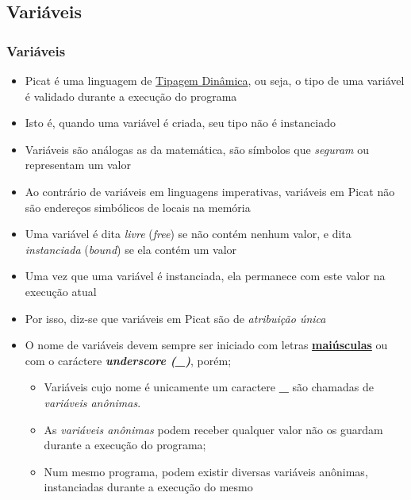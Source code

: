 
\subsection{Variáveis}

\begin{frame}[allowframebreaks=0.90]
	\frametitle{Variáveis}
	
	\begin{itemize}
		
		\item Picat é uma linguagem de \underline{Tipagem Dinâmica}, ou seja, o tipo de uma variável 
		é validado durante a execução do programa
		
		
		\item Isto é, quando uma variável é criada, seu tipo não é instanciado
		
		\item Variáveis são análogas as da matemática, são símbolos que \textit{seguram} ou 
		representam um valor
		
		\item Ao contrário de variáveis em linguagens imperativas, variáveis em Picat não são
		endereços simbólicos de locais na memória
		
		\item Uma variável é dita \textit{livre} (\textit{free}) se não contém nenhum valor, e dita
		\textit{instanciada} (\textit{bound}) se ela contém um valor
		
		\item Uma vez que uma variável é instanciada, ela permanece com este valor na 
		execução atual
		
		\item Por isso, diz-se que variáveis em Picat são de \textit{atribuição única}
		
		\framebreak
		\item O nome de variáveis devem sempre ser iniciado com letras \textbf{\underline{maiúsculas}}
		ou  com o caráctere \textbf{\textit{underscore (\_)}}, porém;
		
		\begin{itemize}
			
			\item Variáveis cujo nome é unicamente um caractere \textbf{\_} são chamadas de 
			\textit{variáveis anônimas}.
			
			\item As 			\textit{variáveis anônimas} podem receber qualquer  valor
			 não os guardam  durante a execução do programa;
			
			\item Num mesmo programa, podem existir diversas variáveis anônimas, instanciadas durante a execução do mesmo
			
		\end{itemize}
		
	\end{itemize}
	
\end{frame}


